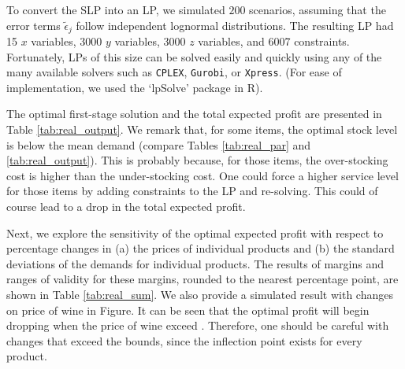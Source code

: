 \documentclass[a4paper,11pt]{article}
\begin{document}
To convert the SLP into an LP, we simulated $200$ scenarios, assuming that the error terms $\tilde{\epsilon}_j$ follow independent lognormal distributions. The resulting LP had 15 $x$ variables, 3000 $y$ variables, 3000 $z$ variables, and 6007 constraints. Fortunately, LPs of this size can be solved easily and quickly using any of the many available solvers such as  {\tt CPLEX}, {\tt Gurobi}, or {\tt Xpress}. (For ease of implementation, we used the `lpSolve' package in R).

The optimal first-stage solution and the total expected profit are presented in Table \ref{tab:real_output}. We remark that, for some items, the optimal stock level is below the mean demand (compare Tables \ref{tab:real_par} and \ref{tab:real_output}). This is probably because, for those items, the over-stocking cost is higher than the under-stocking cost. One could force a higher service level for those items by adding constraints to the LP and re-solving. This could of course lead to a drop in the total expected profit.

\begin{table}[htb]
\centering
\caption{Optimal first-stage solution and expected profit}
\label{tab:real_output}
\end{table}

Next, we explore the sensitivity of the optimal expected profit with respect to percentage changes in (a) the prices of individual products and (b) the standard deviations of the demands for individual products. The results of margins and ranges of validity for these margins, rounded to the nearest percentage point, are shown in Table \ref{tab:real_sum}. We also provide a simulated result with changes on price of wine in Figure. It can be seen that the optimal profit will begin dropping when the price of wine exceed . Therefore, one should be careful with changes that exceed the bounds, since the inflection point exists for every product.
\end{document}
